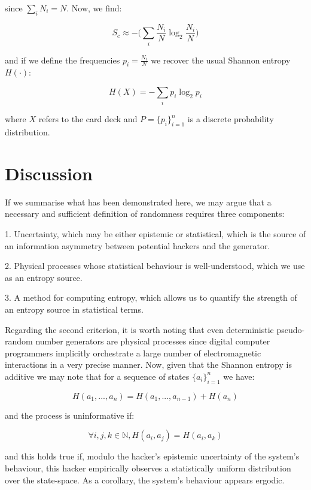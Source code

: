 \documentclass{article}
\begin{document}
since $\sum_i N_i = N$. Now, we find:

\begin{equation}
S_c \approx -\big(\sum_i \frac{N_i}{N} \log_2 \frac{N_i}{N} \big)
\end{equation}

and if we define the frequencies $p_i = \frac{N_i}{N}$ we recover the usual
Shannon entropy $H(\cdot)$:

\begin{equation}
H(X) = - \sum_i p_i \log_2 p_i
\end{equation}

where $X$ refers to the card deck and $P=\{p_i\}_{i=1}^n$ is a discrete probability distribution.

\section{Discussion}

If we summarise what has been demonstrated here, we may argue that a necessary and sufficient definition of randomness requires three components: 

1. Uncertainty, which may be either epistemic or statistical, which is the source of an information asymmetry between potential hackers and the generator. 

2. Physical processes whose statistical behaviour is well-understood, which we use as an entropy source.

3. A method for computing entropy, which allows us to quantify the strength of an entropy source in statistical terms.  

Regarding the second criterion, it is worth noting that even deterministic pseudo-random number generators are physical processes since digital computer programmers implicitly orchestrate a large number of electromagnetic interactions in a very precise manner. Now, given that the Shannon entropy is additive we may note that for a sequence of states $\{a_i\}_{i=1}^n$ we have: 

\begin{equation}
H(a_1,...,a_n)= H(a_1,...,a_{n-1}) + H(a_n)
\end{equation}

and the process is uninformative if: 

\begin{equation}
\forall i,j,k \in \mathbb{N}, H(a_i,a_j) = H(a_i,a_k) 
\end{equation}

and this holds true if, modulo the hacker's epistemic uncertainty of the system's behaviour, this hacker empirically observes a statistically uniform distribution over the state-space. As a corollary, the system's behaviour appears ergodic.  
\end{document}

